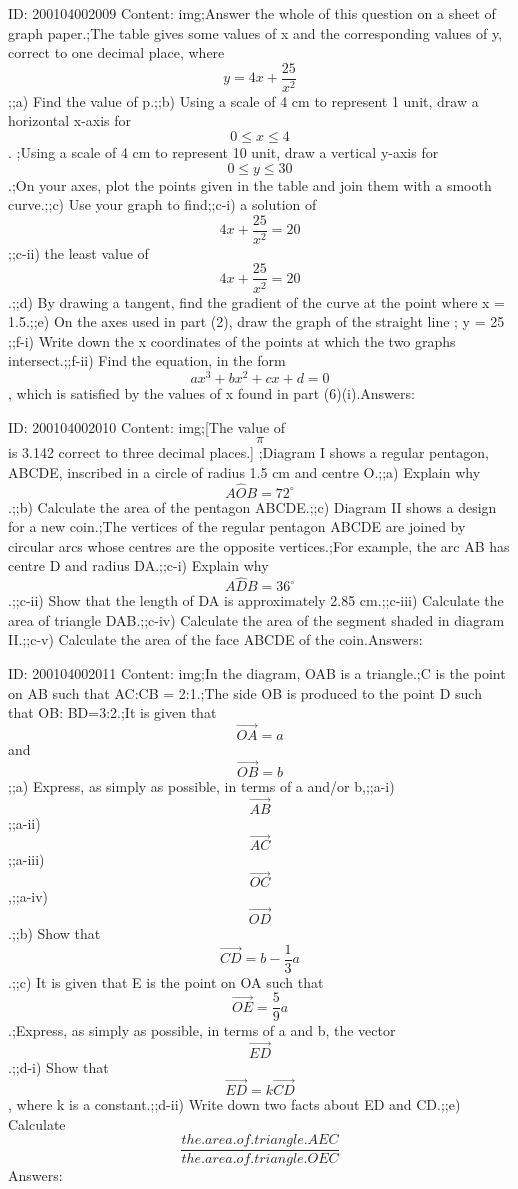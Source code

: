 \documentclass{article}
\begin{document}
ID: 200104002009
Content:
img;Answer the whole of this question on a sheet of graph paper.;The table gives some values of x and the corresponding values of y, correct to one decimal place, where $$y = 4x + \frac{25}{x^2}$$;;a) Find the value of p.;;b) Using a scale of 4 cm to represent 1 unit, draw a horizontal x-axis for $$0 \leq x \leq 4$$. ;Using a scale of 4 cm to represent 10 unit, draw a vertical y-axis for $$0 \leq y \leq 30$$.;On your axes, plot the points given in the table and join them with a smooth curve.;;c) Use your graph to find;;c-i) a solution of $$4x + \frac{25}{x^2} = 20$$;;c-ii) the least value of $$4x + \frac{25}{x^2} = 20$$.;;d) By drawing a tangent, find the gradient of the curve at the point where x = 1.5.;;e) On the axes used in part (2), draw the graph of the straight line ; y = 25 ;;f-i) Write down the x coordinates of the points at which the two graphs intersect.;;f-ii) Find the equation, in the form $$ax^3 + bx^2 + cx + d = 0$$, which is satisfied by the values of x found in part (6)(i).Answers:

ID: 200104002010
Content:
img;[The value of $$\pi$$ is 3.142 correct to three decimal places.] ;Diagram I shows a regular pentagon, ABCDE, inscribed in a circle of radius 1.5 cm and centre O.;;a) Explain why $$A \hat OB = 72^{\circ}$$.;;b) Calculate the area of the pentagon ABCDE.;;c) Diagram II shows a design for a new coin.;The vertices of the regular pentagon ABCDE are joined by circular arcs whose centres are the opposite vertices.;For example, the arc AB has centre D and radius DA.;;c-i) Explain why $$A \hat DB = 36^{\circ}$$.;;c-ii) Show that the length of DA is approximately 2.85 cm.;;c-iii) Calculate the area of triangle DAB.;;c-iv) Calculate the area of the segment shaded in diagram II.;;c-v) Calculate the area of the face ABCDE of the coin.Answers:

ID: 200104002011
Content:
img;In the diagram, OAB is a triangle.;C is the point on AB such that AC:CB = 2:1.;The side OB is produced to the point D such that OB: BD=3:2.;It is given that $$\vec{OA} = a$$ and $$\vec{OB} = b$$;;a) Express, as simply as possible, in terms of a and/or b,;;a-i) $$\vec{AB}$$;;a-ii) $$\vec{AC}$$;;a-iii) $$\vec{OC}$$,;;a-iv) $$\vec{OD}$$.;;b) Show that $$\vec{CD} = b -\frac{1}{3} a$$.;;c) It is given that E is the point on OA such that $$\vec{OE} = \frac{5}{9} a$$.;Express, as simply as possible, in terms of a and b, the vector $$\vec{ED}$$.;;d-i) Show that $$\vec{ED} = k \vec{CD}$$, where k is a constant.;;d-ii) Write down two facts about ED and CD.;;e) Calculate $$\frac{the.area.of.triangle. AEC}{the.area.of.triangle. OEC}$$Answers:
\end{document}
